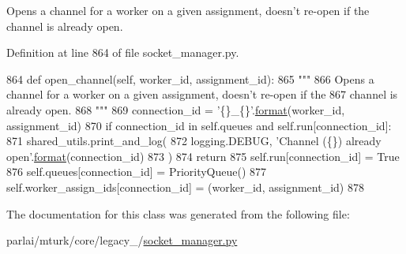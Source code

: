 \begin{DoxyVerb}Opens a channel for a worker on a given assignment, doesn't re-open if the
channel is already open.
\end{DoxyVerb}
 

Definition at line 864 of file socket\+\_\+manager.\+py.


\begin{DoxyCode}
864     \textcolor{keyword}{def }open\_channel(self, worker\_id, assignment\_id):
865         \textcolor{stringliteral}{"""}
866 \textcolor{stringliteral}{        Opens a channel for a worker on a given assignment, doesn't re-open if the}
867 \textcolor{stringliteral}{        channel is already open.}
868 \textcolor{stringliteral}{        """}
869         connection\_id = \textcolor{stringliteral}{'\{\}\_\{\}'}.\hyperlink{namespaceparlai_1_1chat__service_1_1services_1_1messenger_1_1shared__utils_a32e2e2022b824fbaf80c747160b52a76}{format}(worker\_id, assignment\_id)
870         \textcolor{keywordflow}{if} connection\_id \textcolor{keywordflow}{in} self.queues \textcolor{keywordflow}{and} self.run[connection\_id]:
871             shared\_utils.print\_and\_log(
872                 logging.DEBUG, \textcolor{stringliteral}{'Channel (\{\}) already open'}.\hyperlink{namespaceparlai_1_1chat__service_1_1services_1_1messenger_1_1shared__utils_a32e2e2022b824fbaf80c747160b52a76}{format}(connection\_id)
873             )
874             \textcolor{keywordflow}{return}
875         self.run[connection\_id] = \textcolor{keyword}{True}
876         self.queues[connection\_id] = PriorityQueue()
877         self.worker\_assign\_ids[connection\_id] = (worker\_id, assignment\_id)
878 \end{DoxyCode}


The documentation for this class was generated from the following file\+:\begin{DoxyCompactItemize}
\item 
parlai/mturk/core/legacy\+\_/\hyperlink{legacy__2018_2socket__manager_8py}{socket\+\_\+manager.\+py}\end{DoxyCompactItemize}
